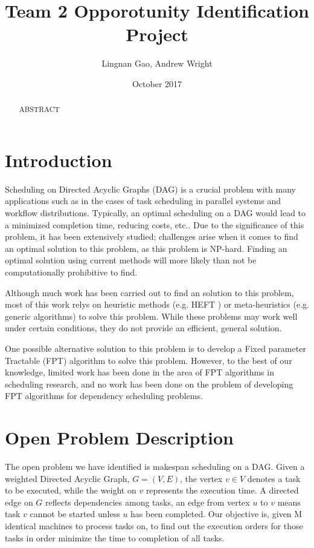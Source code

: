 \documentclass{article}
\title{Team 2 Opporotunity Identification Project}
\author{Lingnan Gao, Andrew Wright}
\date{October 2017}
\begin{document}
\maketitle
\begin{abstract}
    ABSTRACT
\end{abstract}
\newcommand{\defproblem}[4]{%
  \hfill\\\smallskip\noindent%
  \begin{tabularx}{\textwidth}{|l X|}%
    \hline%
    \multicolumn{2}{|l|}{{#1}}\\%
    \textbf{Input:}&#2\\%
    \textbf{Question:}&#4\smallskip\\\hline%
  \end{tabularx}%
  \smallskip%
}%
\section{Introduction}
Scheduling on Directed Acyclic Graphs (DAG) is a crucial problem with many
applications such as in the cases of task scheduling in parallel
systems and workflow distributions. Typically, an optimal scheduling
on a DAG would lead to a minimized completion time,
reducing costs, etc.. Due to the significance of this problem, it has been
extensively studied; challenges arise when it comes to find an optimal solution
to this problem, as this problem is NP-hard. Finding an optimal solution using
current methods will
more likely than not
be computationally prohibitive to find.

Although much work has been carried out to find an solution to this problem, most
of this work relys on heuristic methods (e.g. HEFT \cite{topcuoglu2002performance}) or
meta-heuristics (e.g. generic algorithms) to solve this problem.
While these problems may work well under certain conditions,
they do not provide an efficient, general solution.

One possible alternative solution to this problem is to develop a Fixed
parameter Tractable (FPT)
algorithm to solve this problem. However, to the best of our knowledge,
limited work has been done in the area of FPT algorithms in scheduling
research, and no work has been done on the problem of developing FPT algorithms
for dependency scheduling problems.

\section{Open Problem Description}
The open problem we have identified is makespan scheduling on a DAG.
Given a weighted Directed Acyclic Graph, $G=(V,E)$, the vertex
$v \in V$ denotes a task to be executed, while the weight on $v$
represents the execution time. A directed edge on $G$ reflects
dependencies among tasks, an edge from vertex $u$ to $v$
means task $v$ cannot be started unless $u$ has been completed.
Our objective is, given M identical machines to process tasks on, to find out the execution
orders for those tasks in order minimize the time to completion of all tasks.
\end{document}
